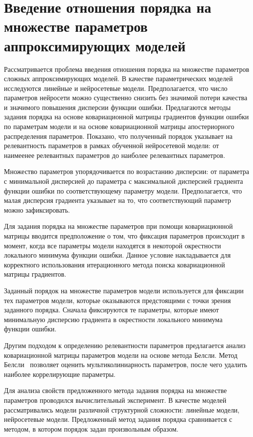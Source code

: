 \chapter{Введение отношения порядка на множестве параметров аппроксимирующих моделей}

Рассматривается проблема введения отношения порядка на множестве параметров сложных аппроксимирующих моделей.
В качестве параметрических моделей исследуются линейные и нейросетевые модели.
Предполагается, что число параметров нейросети можно существенно снизить без значимой потери качества и значимого повышения дисперсии функции ошибки.
Предлагаются методы задания порядка на основе ковариационной матрицы градиентов функции ошибки по параметрам модели и на основе ковариационной матрицы апостериорного распределения параметров.
Показано, что полученный порядок указывает на релевантность параметров в рамках обученной нейросетевой модели: от наимеенее релевантных параметров до наиболее релевантных параметров.

Множество параметров упорядочивается по возрастанию дисперсии: от параметра с минимальной дисперсией до параметра с максимальной дисперсией градиента функции ошибки по соответствующему параметру модели. Предполагается, что малая дисперсия градиента указывает на то, что соответствующий параметр можно зафиксировать.

Для задания порядка на множестве параметров при помощи ковариационной матрицы вводится предположение о том, что фиксация параметров происходит в момент, когда все параметры модели находятся в некоторой окрестности локального минимума функции ошибки. Данное условие накладывается для корректного использования итерационного метода поиска ковариационной матрицы градиентов.

Заданный порядок на множестве параметров модели используется для фиксации тех параметров модели, которые оказываются предстоящими с точки зрения заданного порядка. Сначала фиксируются те параметры, которые имеют минимальную дисперсию градиента в окрестности локального минимума функции ошибки.

Другим подходом к определению релевантности параметров предлагается анализ ковариационной матрицы параметров модели на основе метода Белсли. Метод Белсли~\cite{neychev2016} позволяет оценить мультиколиниарность параметров, после чего удалить наиболее коррелирующие параметры.

Для анализа свойств предложенного метода задания порядка на множестве параметров проводился вычислительный эксперимент. В качестве моделей рассматривались модели различной структурной сложности: линейные модели, нейросетевые модели. Предложенный метод задания порядка сравнивается с методом, в котором порядок задан произвольным образом.

